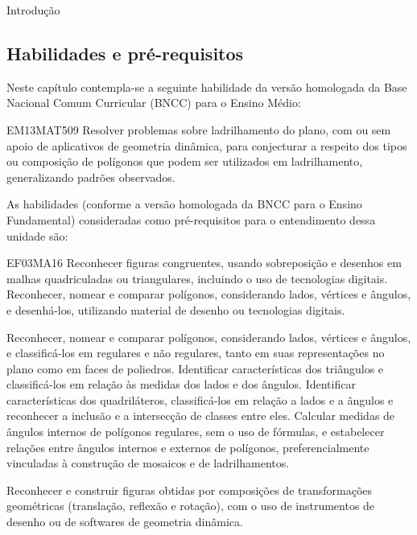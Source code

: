 \begin{apresentacao}{Introdução}
\subsection *{Habilidades e pré-requisitos}

Neste capítulo contempla-se a seguinte habilidade da versão homologada da Base Nacional Comum Curricular (BNCC) para o Ensino Médio:

\begin{habilities}{EM13MAT509}
Resolver problemas sobre ladrilhamento do plano, com ou sem apoio de aplicativos de geometria dinâmica, para conjecturar a respeito dos tipos ou composição de polígonos que podem ser utilizados em ladrilhamento, generalizando padrões observados.
\end{habilities}

 
As habilidades (conforme a versão homologada da BNCC para o Ensino Fundamental) consideradas como pré-requisitos para o entendimento dessa unidade são:

\begin{habilities}{EF03MA16}
Reconhecer figuras congruentes, usando sobreposição e desenhos em malhas quadriculadas ou triangulares, incluindo o uso de tecnologias digitais.
 Reconhecer, nomear e comparar polígonos, considerando lados, vértices e ângulos, e desenhá-los, utilizando material de desenho ou tecnologias digitais.

 Reconhecer, nomear e comparar polígonos, considerando lados, vértices e ângulos, e classificá-los em regulares e não regulares, tanto em suas representações no plano como em faces de poliedros.
 Identificar características dos triângulos e classificá-los em relação às medidas dos lados e dos ângulos.
 Identificar características dos quadriláteros, classificá-los em relação a lados e a ângulos e reconhecer a inclusão e a intersecção de classes entre eles.
 Calcular medidas de ângulos internos de polígonos regulares, sem o uso de fórmulas, e estabelecer relações entre ângulos internos e externos de polígonos,
preferencialmente vinculadas à construção de mosaicos e de ladrilhamentos.

 Reconhecer e construir figuras obtidas por composições de transformações geométricas (translação, reflexão e rotação), com o uso de instrumentos de desenho ou de softwares de geometria dinâmica.
\end{habilities}





\end{apresentacao}
